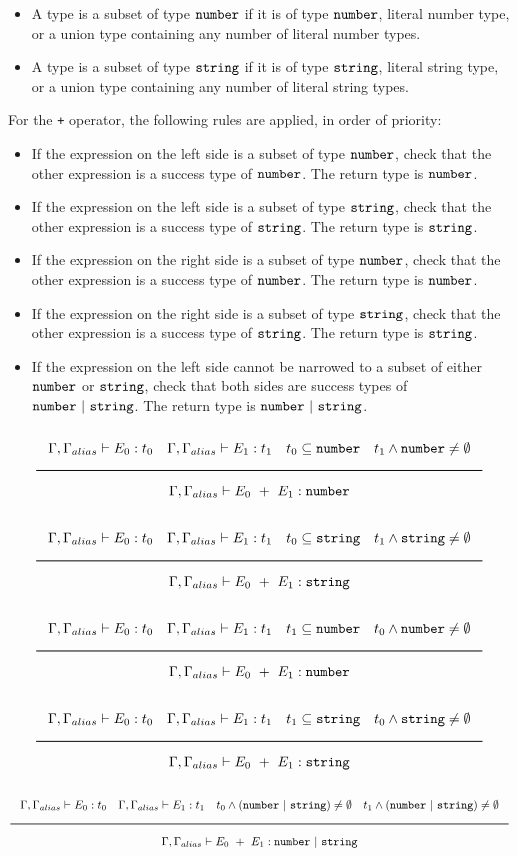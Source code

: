 \begin{itemize}
\item{A type is a subset of type $\texttt{number}$ if it is of type $\texttt{number}$, literal number type,
  or a union type containing any number of literal number types.}
\item{A type is a subset of type $\texttt{string}$ if it is of type $\texttt{string}$, literal string type,
  or a union type containing any number of literal string types.}
\end{itemize}

For the \texttt{+} operator, the following rules are applied, in order of priority:

\begin{itemize}
\item{If the expression on the left side is a subset of type $\texttt{number}$,
  check that the other expression is a success type of $\texttt{number}$. The return type is $\texttt{number}$.}
\item{If the expression on the left side is a subset of type $\texttt{string}$,
  check that the other expression is a success type of $\texttt{string}$. The return type is $\texttt{string}$.}
\item{If the expression on the right side is a subset of type $\texttt{number}$,
  check that the other expression is a success type of $\texttt{number}$. The return type is $\texttt{number}$.}
\item{If the expression on the right side is a subset of type $\texttt{string}$,
  check that the other expression is a success type of $\texttt{string}$. The return type is $\texttt{string}$.}
\item{If the expression on the left side cannot be narrowed to a subset of either $\texttt{number}$ or $\texttt{string}$, check that both sides are success types of 
  $\Number\ |\ \String$. The return type is $\Number\ |\ \String$.}
\end{itemize}

\noindent
\[
  \Rule{\Gamma, \Gamma_{alias} \vdash E_0 : t_0 \quad \Gamma, \Gamma_{alias} \vdash E_1 : t_1 \quad t_0 \subseteq \Number
    \quad t_1 \wedge \Number \neq \emptyset}{\Gamma, \Gamma_{alias} \vdash E_0\ + \ E_1 : \Number}
\]
\noindent
\[
  \Rule{\Gamma, \Gamma_{alias} \vdash E_0 : t_0 \quad \Gamma, \Gamma_{alias} \vdash E_1 : t_1 \quad t_0 \subseteq \String
    \quad t_1 \wedge \String \neq \emptyset}{\Gamma, \Gamma_{alias} \vdash E_0\ + \ E_1 : \String}
\]
\noindent
\[
  \Rule{\Gamma, \Gamma_{alias} \vdash E_0 : t_0 \quad \Gamma, \Gamma_{alias} \vdash E_1 : t_1 \quad t_1 \subseteq \Number
    \quad t_0 \wedge \Number \neq \emptyset}{\Gamma, \Gamma_{alias} \vdash E_0\ + \ E_1 : \Number}
\]
\noindent
\[
  \Rule{\Gamma, \Gamma_{alias} \vdash E_0 : t_0 \quad \Gamma, \Gamma_{alias} \vdash E_1 : t_1 \quad t_1 \subseteq \String
    \quad t_0 \wedge \String \neq \emptyset}{\Gamma, \Gamma_{alias} \vdash E_0\ + \ E_1 : \String}
\]
\noindent
\[
  \Rule{\Gamma, \Gamma_{alias} \vdash E_0 : t_0 \quad \Gamma, \Gamma_{alias} \vdash E_1 : t_1 \quad t_0 \wedge (\Number\ |\ \String) \neq \emptyset
    \quad t_1 \wedge (\Number\ |\ \String) \neq \emptyset}{\Gamma, \Gamma_{alias} \vdash E_0\ + \ E_1 : \Number\ |\ \String}
\]
\noindent

